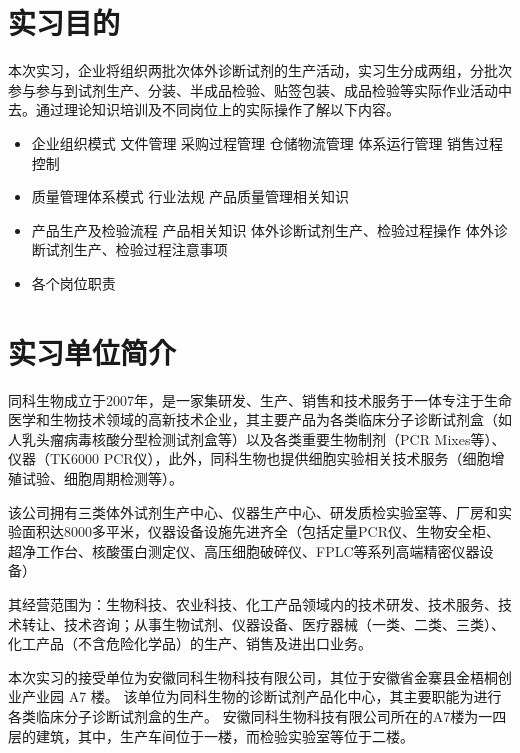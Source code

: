 \section{实习目的}

本次实习，企业将组织两批次体外诊断试剂的生产活动，实习生分成两组，分批次参与参与到试剂生产、分装、半成品检验、贴签包装、成品检验等实际作业活动中去。通过理论知识培训及不同岗位上的实际操作了解以下内容。

\begin{itemize}
    \item 企业组织模式
        \subitem 文件管理
        \subitem 采购过程管理
        \subitem 仓储物流管理
        \subitem 体系运行管理
        \subitem 销售过程控制
    \item 质量管理体系模式
        \subitem 行业法规
        \subitem 产品质量管理相关知识
    \item 产品生产及检验流程
        \subitem 产品相关知识
        \subitem 体外诊断试剂生产、检验过程操作
        \subitem 体外诊断试剂生产、检验过程注意事项
    \item 各个岗位职责
\end{itemize}

\section{实习单位简介}

同科生物成立于2007年，是一家集研发、生产、销售和技术服务于一体专注于生命医学和生物技术领域的高新技术企业，其主要产品为各类临床分子诊断试剂盒（如人乳头瘤病毒核酸分型检测试剂盒等）以及各类重要生物制剂（PCR Mixes等）、仪器（TK6000 PCR仪），此外，同科生物也提供细胞实验相关技术服务（细胞增殖试验、细胞周期检测等）。

该公司拥有三类体外试剂生产中心、仪器生产中心、研发质检实验室等、厂房和实验面积达8000多平米，仪器设备设施先进齐全（包括定量PCR仪、生物安全柜、超净工作台、核酸蛋白测定仪、高压细胞破碎仪、FPLC等系列高端精密仪器设备）

其经营范围为：生物科技、农业科技、化工产品领域内的技术研发、技术服务、技术转让、技术咨询；从事生物试剂、仪器设备、医疗器械（一类、二类、三类）、化工产品（不含危险化学品）的生产、销售及进出口业务。

本次实习的接受单位为安徽同科生物科技有限公司，其位于安徽省金寨县金梧桐创业产业园 A7 楼。
该单位为同科生物的诊断试剂产品化中心，其主要职能为进行各类临床分子诊断试剂盒的生产。
安徽同科生物科技有限公司所在的A7楼为一四层的建筑，其中，生产车间位于一楼，而检验实验室等位于二楼。


